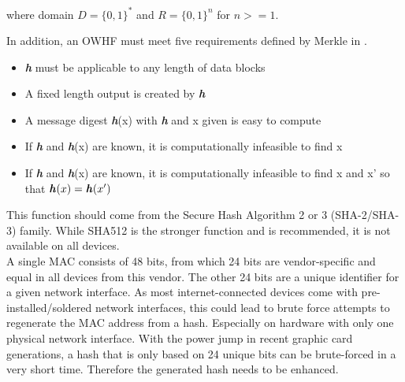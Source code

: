         where domain $D = \{0,1\}^*$ and $R=\{0,1\}^n$ for $n >= 1$.
        
        In addition, an OWHF must meet five requirements defined by Merkle in  \cite{merkle_secrecy_1979}.
        \begin{itemize}
            \item \textbf{\textit{h}} must be applicable to any length of data blocks
            \item A fixed length output is created by \textbf{\textit{h}}
            \item A message digest \textbf{\textit{h}}(x) with \textbf{\textit{h}} and x given is easy to compute
            \item If \textbf{\textit{h}} and \textbf{\textit{h}}(x) are known, it is computationally infeasible to find x
            \item If \textbf{\textit{h}} and \textbf{\textit{h}}(x) are known, it is computationally infeasible to find x and x' so that $\textbf{\textit{h}}(x) = \textbf{\textit{h}}(x')$
        \end{itemize}
        
        This function should come from the Secure Hash Algorithm 2 or 3 (SHA-2/SHA-3) family. While SHA512 is the stronger function and is recommended, it is not available on all devices.\\
        A single MAC consists of 48 bits, from which 24 bits are vendor-specific and equal in all devices from this vendor. The other 24 bits are a unique identifier for a given network interface. As most internet-connected devices come with pre-installed/soldered network interfaces, this could lead to brute force attempts to regenerate the MAC address from a hash. Especially on hardware with only one physical network interface. With the power jump in recent graphic card generations, a hash that is only based on 24 unique bits can be brute-forced in a very short time. Therefore the generated hash needs to be enhanced.\\
        
